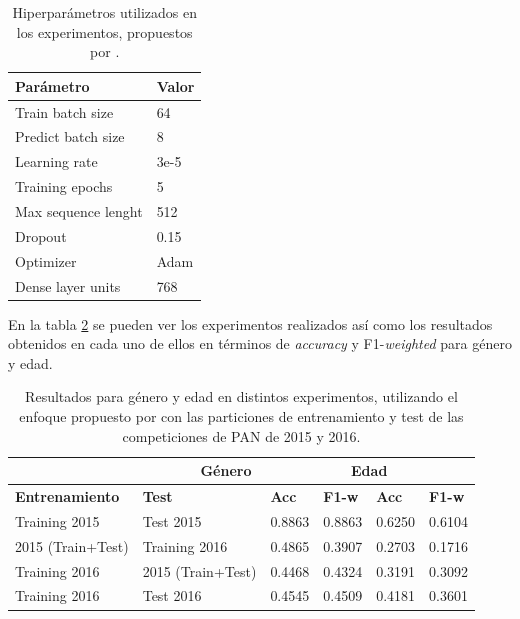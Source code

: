 \begin{table}[hp!]
    \centering
    \begin{tabular}{ll}
        \hline
        \textbf{Parámetro}  & \textbf{Valor} \\ \hline
        Train batch size    & 64             \\
        Predict batch size  & 8              \\
        Learning rate       & 3e-5           \\
        Training epochs     & 5              \\
        Max sequence lenght & 512            \\
        Dropout             & 0.15           \\
        Optimizer           & Adam           \\
        Dense layer units   & 768            \\ \hline
    \end{tabular}
    \caption{Hiperparámetros utilizados en los experimentos, propuestos por \citet{loscalis22}.}
    \label{tab:hiperparametros}
\end{table}
En la tabla \ref{tab:resultados-bert} se pueden ver los experimentos realizados así como los resultados obtenidos en cada uno de ellos en términos de \textit{accuracy} y F1-\textit{weighted} para género y edad.

\begin{table}[H]
    \centering
    {
    \setlength{\tabcolsep}{0.6\tabcolsep}
        \begin{tabular}{|l|l|ll|ll|}
            \hline
            \rowcolor{udcpink!25}
            \multicolumn{2}{|c|}{\textbf{\textit{Dataset}}} & \multicolumn{2}{c|}{\textbf{Género}} & \multicolumn{2}{c|}{\textbf{Edad}} \\ \hline
            \textbf{Entrenamiento} & \textbf{Test} & \textbf{Acc} & \textbf{F1-w} & \textbf{Acc} & \textbf{F1-w}\\ \hline
            Training 2015     & Test 2015         & 0.8863   & 0.8863 & 0.6250   & 0.6104\\
            2015 (Train+Test) & Training 2016     & 0.4865 & 0.3907 & 0.2703     & 0.1716\\
            Training 2016     & 2015 (Train+Test) & 0.4468   & 0.4324 & 0.3191   & 0.3092\\
            Training 2016     & Test 2016         & 0.4545   & 0.4509 & 0.4181   & 0.3601\\ \hline
        \end{tabular}
    }
    \caption{Resultados para género y edad en distintos experimentos, utilizando el enfoque propuesto por \citet{loscalis22} con las particiones de entrenamiento y test de las competiciones de PAN de 2015 y 2016.}
    \label{tab:resultados-bert}
\end{table}

